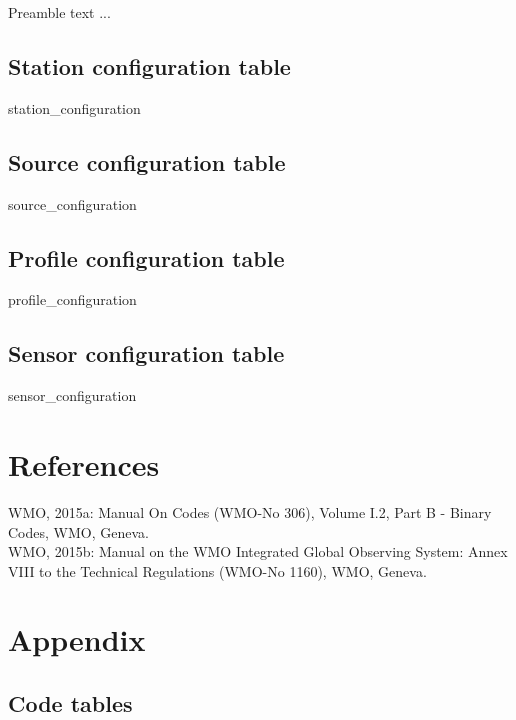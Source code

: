 \documentclass[a4paper]{article}
\begin{document}
Preamble text ... \\



\subsection {Station configuration table}

 {station_configuration}


\subsection {Source configuration table}

 {source_configuration}

\subsection {Profile configuration table}

 {profile_configuration}

\subsection {Sensor configuration table}

 {sensor_configuration}


\section {References}

\noindent WMO, 2015a: Manual On Codes (WMO-No 306), Volume I.2, Part B - Binary Codes, WMO, Geneva.\\
\noindent WMO, 2015b:  Manual on the WMO Integrated Global Observing System: Annex VIII to the Technical Regulations (WMO-No 1160), WMO, Geneva.


\section {Appendix}

\subsection {Code tables}
\end{document}
